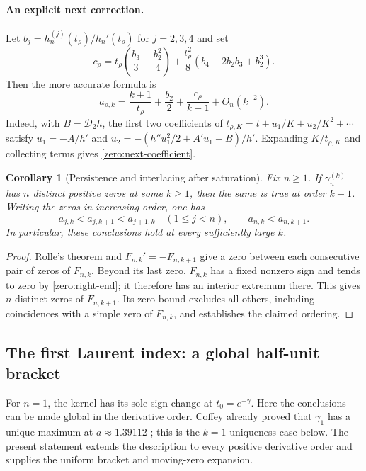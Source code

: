 \documentclass[11pt,a4paper]{article}
\newtheorem{corollary}[theorem]{Corollary}
\theoremstyle{definition}
\theoremstyle{remark}
\numberwithin{equation}{section}
\begin{document}
\paragraph{An explicit next correction.}
Let $b_j=h_n^{(j)}(t_\rho)/h_n'(t_\rho)$ for $j=2,3,4$ and set
\begin{equation}\label{zero:next-coefficient}
 c_\rho=t_\rho\left(\frac{b_3}{3}-\frac{b_2^2}{4}\right)
      +\frac{t_\rho^2}{8}
                    \left(b_4-2b_2b_3+b_2^3\right).
\end{equation}
Then the more accurate formula is
\begin{equation}\label{zero:location-second}
 a_{\rho,k}=\frac{k+1}{t_\rho}+\frac{b_2}{2}
                         +\frac{c_\rho}{k+1}+O_n(k^{-2}).
\end{equation}
Indeed, with $B=\mathcal D_2h$, the first two coefficients of
$t_{\rho,K}=t+u_1/K+u_2/K^2+\cdots$ satisfy
$u_1=-A/h'$ and
$u_2=-(h''u_1^2/2+A'u_1+B)/h'$.  Expanding $K/t_{\rho,K}$
and collecting terms gives \eqref{zero:next-coefficient}.

\begin{corollary}[Persistence and interlacing after saturation]
\label{zero:k-interlace}
Fix $n\geq1$. If $\gamma_n^{(k)}$ has $n$ distinct positive
zeros at some $k\geq1$, then the same is true at order $k+1$.
Writing the zeros in increasing order, one has
\[
 a_{j,k}<a_{j,k+1}<a_{j+1,k}\quad(1\leq j<n),
 \qquad a_{n,k}<a_{n,k+1}.
\]
In particular, these conclusions hold at every sufficiently large $k$.
\end{corollary}
\begin{proof}
Rolle's theorem and $F_{n,k}'=-F_{n,k+1}$ give a zero between each
consecutive pair of zeros of $F_{n,k}$.  Beyond its last zero,
$F_{n,k}$ has a fixed nonzero sign and tends to zero by
\eqref{zero:right-end}; it therefore has an interior extremum there.
This gives $n$ distinct zeros of $F_{n,k+1}$.  Its zero bound
excludes all others, including coincidences with a simple zero of
$F_{n,k}$, and establishes the claimed ordering.
\end{proof}

\subsection{The first Laurent index: a global half-unit bracket}

For $n=1$, the kernel has its sole sign change at $t_0=e^{-\gamma}$.
Here the conclusions can be made global in the derivative order.
Coffey already proved that $\gamma_1$ has a unique maximum at
$a\approx1.39112$ \cite[Proposition 5]{Coffey2009}; this is the
$k=1$ uniqueness case below.  The present statement extends the
description to every positive derivative order and supplies the
uniform bracket and moving-zero expansion.
\end{document}
